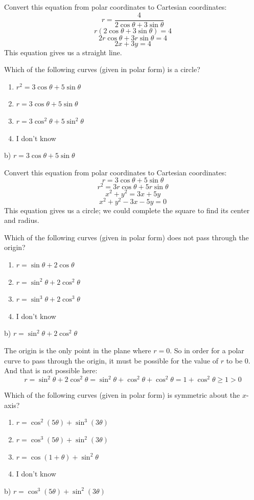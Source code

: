 \documentclass[addpoints,12pt,answers]{exam}
\begin{document}
\begin{questions}
\begin{solution}
    Convert this equation from polar coordinates to Cartesian coordinates:
    $$r=\frac{4}{2\cos\theta+3\sin\theta}$$
    $$r(2\cos\theta+3\sin\theta)=4$$
    $$2r\cos\theta+3r\sin\theta=4$$
    $$2x+3y=4$$
    This equation gives us a straight line.    
  \end{solution}
  \newpage
  \question
  Which of the following curves (given in polar form) is a circle?
  \begin{enumerate}[label=\alph*)]
    \item
    $r^2=3\cos\theta+5\sin\theta$
    \item
    $r=3\cos\theta+5\sin\theta$
    \item
    $r=3\cos^2\theta+5\sin^2\theta$
    \item
    I don't know
  \end{enumerate}
  \begin{solution}
    b) $r=3\cos\theta+5\sin\theta$
    
    Convert this equation from polar coordinates to Cartesian coordinates:
    $$r=3\cos\theta+5\sin\theta$$
    $$r^2=3r\cos\theta+5r\sin\theta$$
    $$x^2+y^2=3x+5y$$
    $$x^2+y^2-3x-5y=0$$
    This equation gives us a circle; we could complete the square to find its center and radius.    
  \end{solution}
  \newpage
  \question
  Which of the following curves (given in polar form) does not pass through the origin?
  \begin{enumerate}[label=\alph*)]
    \item
    $r=\sin\theta+2\cos\theta$
    \item
    $r=\sin^2\theta+2\cos^2\theta$
    \item
    $r=\sin^3\theta+2\cos^3\theta$
    \item
    I don't know
  \end{enumerate}
  \begin{solution}
    b) $r=\sin^2\theta+2\cos^2\theta$
    
    The origin is the only point in the plane where $r=0$. So in order for a polar curve to pass through the origin, it must be possible for the value of $r$ to be 0. And that is not possible here:
    $$r=\sin^2\theta+2\cos^2\theta=\sin^2\theta+\cos^2\theta+\cos^2\theta=1+\cos^2\theta\ge 1>0$$
  \end{solution}
  \newpage
  \question
  Which of the following curves (given in polar form) is symmetric about the $x$-axis?
  \begin{enumerate}[label=\alph*)]
    \item
    $r=\cos^2(5\theta)+\sin^3(3\theta)$
    \item
    $r=\cos^3(5\theta)+\sin^2(3\theta)$
    \item
    $r=\cos(1+\theta)+\sin^2\theta$
    \item
    I don't know
  \end{enumerate}
  \begin{solution}
    b) $r=\cos^3(5\theta)+\sin^2(3\theta)$
    

\end{solution}
\end{questions}
\end{document}
